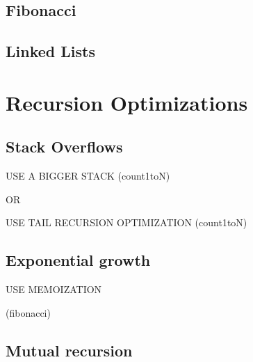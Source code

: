 \documentclass[a4paper, 9pt]{extarticle}
\begin{document}
\subsection{Fibonacci}


\subsection{Linked Lists}


\section{Recursion Optimizations}



\subsection{Stack Overflows}

USE A BIGGER STACK (count1toN)

OR

USE TAIL RECURSION OPTIMIZATION (count1toN)

\subsection{Exponential growth}

USE MEMOIZATION

(fibonacci)




\subsection{Mutual recursion}
\end{document}
